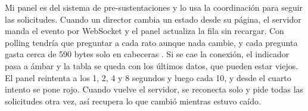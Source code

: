 Mi panel es del sistema de pre-sustentaciones y lo usa la coordinación para seguir las solicitudes.
Cuando un director cambia un estado desde su página, el servidor manda el evento por WebSocket y el panel
actualiza la fila sin recargar. Con polling tendría que preguntar a cada rato aunque nada cambie, y cada
pregunta gasta cerca de 590 bytes solo en cabeceras \cite[p.~1197]{Murley2021}.
Si se cae la conexión, el indicador pasa a ámbar y la tabla se queda con los últimos datos, que pueden
estar viejos. El panel reintenta a los 1, 2, 4 y 8 segundos y luego cada 10, y desde el cuarto intento se
pone rojo. Cuando vuelve el servidor, se reconecta solo y pide todas las solicitudes otra vez, así
recupera lo que cambió mientras estuvo caído.
